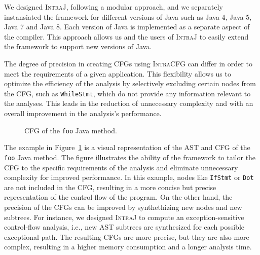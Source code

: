 We designed \textsc{IntraJ}, following a  modular approach, and we separately 
instansiated the framework for different versions of Java such as Java 4, 
Java 5, Java 7 and Java 8. Each version of Java is implemented as a separate
aspect of the compiler. This approach allows us and the users of \textsc{IntraJ}
to easily extend the framework to support new versions of Java.

The degree of precision in creating CFGs using \textsc{IntraCFG} can differ in order
to meet the requirements of a given application.
This flexibility allows us to optimize the efficiency of the analysis by selectively 
excluding certain nodes from the CFG, such as \texttt{WhileStmt}, which do not
provide any information relevant to the analyses. This leads in the reduction of
unnecessary complexity and with an overall improvement in the analysis's performance.
\begin{figure}[H]
	\centering
	\caption{\label{fig:CFG} CFG of the \texttt{foo} Java method.}
\end{figure}

The example in Figure~\ref{fig:CFG} is a visual representation of the AST and CFG of the 
\texttt{foo} Java method. The figure illustrates the ability of the framework to tailor the CFG
to the specific requirements of the analysis and eliminate unnecessary complexity for improved performance.
In this example, nodes like \texttt{IfStmt} or \texttt{Dot} are not included in the CFG,
resulting in a more concise but precise representation of the control flow of the program.
On the other hand, the precision of the CFGs can be improved by synthethizing new nodes and new subtrees. 
For instance, we designed \textsc{IntraJ} to compute an exception-sensitive 
control-flow analysis, i.e., new AST subtrees are synthesized for each possible exceptional path. 
The resulting CFGs are more precise, but they are also more complex, resulting 
in a higher memory consumption and a longer analysis time.



